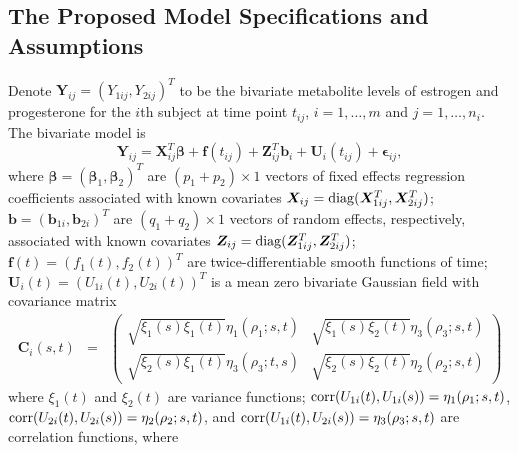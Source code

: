 \documentclass[article,lineno]{biometrika}
\begin{document}
\subsection{The Proposed Model Specifications and Assumptions}
Denote $\bm Y_{ij} = (Y_{1ij}, Y_{2ij})^T$ to be the bivariate metabolite levels of estrogen and progesterone for the $i$th subject at time point $t_{ij}$, 
$i = 1, \dots, m$ and $j = 1, \dots, n_i$. 
The bivariate model is
\begin{equation} \label{biv}
\boldsymbol Y_{ij} 
=
\boldsymbol X_{ij}^T\boldsymbol{\beta} +
\boldsymbol f(t_{ij}) + \boldsymbol Z_{ij}^T
\boldsymbol b_{i} + 
\boldsymbol U_{i}(t_{ij}) + 
\boldsymbol \epsilon_{ij},
\end{equation}
where 
$\bm \beta = (\bm \beta_1, \bm \beta_2)^T$ are $(p_1 +p_2) \times 1$ vectors of fixed effects regression coefficients associated with known covariates $\bm X_{ij}={\rm diag}(\bm X_{1ij}^T, \bm X_{2ij}^T)$; 
$\bm b = (\bm b_{1i}, \bm b_{2i})^T$ are $(q_1 +q_2) \times 1$ vectors of random effects, respectively, associated with known covariates $\bm Z_{ij}={\rm diag}(\bm Z_{1ij}^T, \bm Z_{2ij}^T)$; 
$\bm f(t) = (f_1(t), f_2(t))^T$ are  twice-differentiable  smooth functions of time; 
$\bm U_i(t) = (U_{1i}(t), U_{2i}(t))^T$ is a mean zero bivariate Gaussian field  with 
covariance matrix 
\begin{eqnarray*}
\boldsymbol C_i(s, t) &=&
  \begin{pmatrix}
 \sqrt {\xi_1(s) \xi_1(t)} \eta_1(\rho_1; s, t) &   \sqrt {\xi_1(s) \xi_2(t)} \eta_3(\rho_3; s, t)
  \\
 \sqrt {\xi_2(s) \xi_1(t)} \eta_3(\rho_3; t, s)
 &   \sqrt {\xi_2(s) \xi_2(t)} \eta_2(\rho_2; s, t)
 \end{pmatrix}
\end{eqnarray*}
where 
$\xi_1(t)$ and $\xi_2(t)$ are  variance functions;  
${\rm corr} (U_{1i}(t), U_{1i}(s)) = \eta_1(\rho_1; s, t)$,  \\
${\rm corr} (U_{2i}(t), U_{2i}(s)) = \eta_2(\rho_2; s, t)$, 
and ${\rm corr} (U_{1i}(t), U_{2i}(s)) = \eta_3(\rho_3; s, t)$
 are correlation functions, where 
\end{document}
